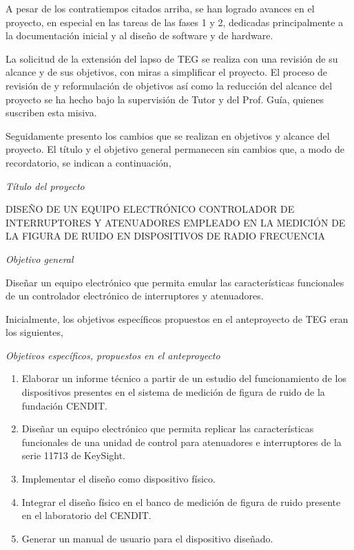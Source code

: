 \documentclass[paper=letter,oneside,fontsize=12pt, parskip=full]{article}
\begin{document}
	A pesar de los contratiempos citados arriba, se han logrado avances en el proyecto, en especial en las tareas de las fases 1 y 2, dedicadas principalmente a la documentación inicial y al diseño de software y de hardware. 
	
	La solicitud de la extensión del lapso de TEG se realiza con una revisión de su alcance y de sus objetivos, con miras a simplificar el proyecto. El proceso de revisión de y reformulación de objetivos así como la reducción del alcance del proyecto se ha hecho bajo la supervisión de Tutor y del Prof. Guía, quienes suscriben esta misiva. 
	
	Seguidamente presento los cambios que se realizan en objetivos y alcance del proyecto. El título y el objetivo general permanecen sin cambios que, a modo de recordatorio, se indican a continuación,
	
	\newpage
	
	\emph{Título del proyecto}

	\begin{minipage}{0.95\textwidth}
		\centering
		DISEÑO DE UN EQUIPO ELECTRÓNICO CONTROLADOR DE INTERRUPTORES Y ATENUADORES EMPLEADO EN LA MEDICIÓN DE LA FIGURA DE RUIDO EN DISPOSITIVOS DE RADIO FRECUENCIA
	\end{minipage}

	\emph{Objetivo general}
	
	\hfill%
	\begin{minipage}{0.95\textwidth}
		Diseñar un equipo electrónico que permita emular las características funcionales de un controlador electrónico de interruptores y atenuadores.
	\end{minipage}
	
	Inicialmente, los objetivos específicos propuestos en el anteproyecto de TEG eran los siguientes,
	
	\emph{Objetivos específicos, propuestos en el anteproyecto}
	
	\begin{enumerate}
		\item Elaborar un informe técnico a partir de un estudio del funcionamiento de los
		dispositivos presentes en el sistema de medición de figura de ruido de la fundación
		CENDIT.
		
		\item Diseñar un equipo electrónico que permita replicar las características funcionales de
		una unidad de control para atenuadores e interruptores de la serie 11713 de KeySight.
		
		\item Implementar el diseño como dispositivo físico.
		
		\item Integrar el diseño físico en el banco de medición de figura de ruido presente en el
		laboratorio del CENDIT.
		
		\item Generar un manual de usuario para el dispositivo diseñado.
	\end{enumerate}	
	
\end{document}
